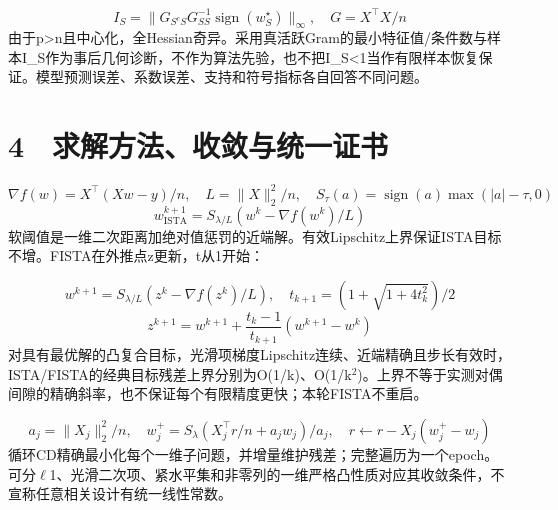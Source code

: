 \documentclass[UTF8,fontset=fandol,10pt]{ctexart}
\begin{document}
\begin{equation}I_S=\|G_{S^cS}G_{SS}^{-1}\operatorname{sign}(w^\star_S)\|_\infty,\quad G=X^\top X/n\end{equation}
由于p>n且中心化，全Hessian奇异。采用真活跃Gram的最小特征值/条件数与样本I\_S作为事后几何诊断，不作为算法先验，也不把I\_S<1当作有限样本恢复保证。模型预测误差、系数误差、支持和符号指标各自回答不同问题。

\clearpage
\section*{4　求解方法、收敛与统一证书}
\begin{equation}\nabla f(w)=X^\top(Xw-y)/n,\quad L=\|X\|_2^2/n,\quad S_\tau(a)=\operatorname{sign}(a)\max(|a|-\tau,0)\end{equation}
\begin{equation}w^{k+1}_{\mathrm{ISTA}}=S_{\lambda/L}(w^k-\nabla f(w^k)/L)\end{equation}
软阈值是一维二次距离加绝对值惩罚的近端解。有效Lipschitz上界保证ISTA目标不增。FISTA在外推点z更新，t从1开始：

\begin{equation}w^{k+1}=S_{\lambda/L}(z^k-\nabla f(z^k)/L),\quad t_{k+1}=(1+\sqrt{1+4t_k^2})/2\end{equation}
\begin{equation}z^{k+1}=w^{k+1}+\frac{t_k-1}{t_{k+1}}(w^{k+1}-w^k)\end{equation}
对具有最优解的凸复合目标，光滑项梯度Lipschitz连续、近端精确且步长有效时，ISTA/FISTA的经典目标残差上界分别为O(1/k)、O(1/k\ensuremath{^2})\cite{beck2009}。上界不等于实测对偶间隙的精确斜率，也不保证每个有限精度更快；本轮FISTA不重启。

\begin{equation}a_j=\|X_j\|_2^2/n,\quad w_j^+=S_\lambda(X_j^\top r/n+a_jw_j)/a_j,\quad r\leftarrow r-X_j(w_j^+-w_j)\end{equation}
循环CD精确最小化每个一维子问题，并增量维护残差；完整遍历为一个epoch\cite{friedman2010}。可分\ensuremath{\ell}1、光滑二次项、紧水平集和非零列的一维严格凸性质对应其收敛条件\cite{tseng2001}，不宣称任意相关设计有统一线性常数。
\end{document}
